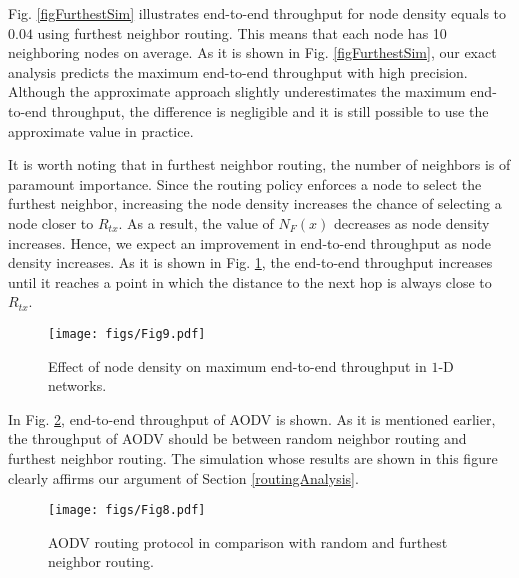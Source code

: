 \documentclass[12pt, draftclsnofoot, onecolumn]{IEEEtran}
\begin{document}

Fig. \ref{figFurthestSim} illustrates end-to-end throughput for 
node density equals to $0.04$ using furthest neighbor routing. 
This means that each node has 10 neighboring nodes on average. As it is shown in Fig. 
\ref{figFurthestSim}, our exact analysis predicts the maximum 
end-to-end throughput with high precision. Although the approximate 
approach slightly underestimates the maximum end-to-end throughput, 
the difference is negligible and it is still possible to use the approximate 
value in practice.


It is worth noting that in furthest neighbor routing, the number 
of neighbors is of paramount importance. Since the routing policy 
enforces a node to select the furthest neighbor, increasing the 
node density increases the chance of selecting a node closer to 
$R_{tx}$. As a result, the value of $N_F(x)$ decreases as node 
density increases. Hence, we expect an improvement in end-to-end 
throughput as node density increases. As it is shown in Fig. 
\ref{figDensitySim}, the end-to-end throughput increases until 
it reaches a point in which the distance to the next hop is always 
close to $R_{tx}$. 

\begin{figure}
\centering
\texttt{[image: figs/Fig9.pdf]}
\caption{Effect of node density on maximum end-to-end throughput in $1$-D networks.}
\label{figDensitySim}
\end{figure}


In Fig. \ref{figAODVSim}, end-to-end throughput of AODV is shown. 
As it is mentioned earlier, the throughput of AODV should be between 
random neighbor routing and furthest neighbor routing. The simulation 
whose results are shown in this figure clearly affirms our argument of 
Section \ref{routingAnalysis}.

\begin{figure}
\centering
\texttt{[image: figs/Fig8.pdf]}
\caption{AODV routing protocol in comparison with random and furthest neighbor routing.}
\label{figAODVSim}
\end{figure}
\end{document}
